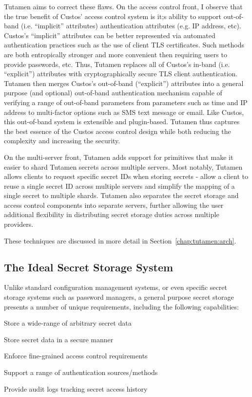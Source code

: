 Tutamen aims to correct these flaws. On the access control front, I
observe that the true benefit of Custos' access control system is it;s
ability to support out-of-band (i.e. ``implicit'' attributes)
authentication attributes (e.g. IP address, etc). Custos's
``implicit'' attributes can be better represented via automated
authentication practices such as the use of client TLS
certificates. Such methods are both entropically stronger and more
convenient then requiring users to provide passwords, etc. Thus,
Tutamen replaces all of Custos's in-band (i.e. ``explicit'')
attributes with cryptographically secure TLS client
authentication. Tutamen then merges Custos's out-of-band
(``explicit'') attributes into a general purpose (and optional)
out-of-band authentication mechanism capable of verifying a range of
out-of-band parameters from parameters such as time and IP address to
multi-factor options such as SMS text message or email. Like Custos,
this out-of-band system is extensible and plugin-based. Tutamen thus
captures the best essence of the Custos access control design while
both reducing the complexity and increasing the security.

On the multi-server front, Tutamen adds support for primitives that
make it easier to shard Tutamen secrets across multiple servers. Most
notably, Tutamen allows clients to request specific secret IDs when
storing secrets - allow a client to reuse a single secret ID across
multiple servers and simplify the mapping of a single secret to
multiple shards. Tutamen also separates the secret storage and access
control components into separate servers, further allowing the user
additional flexibility in distributing secret storage duties across
multiple providers.

These techniques are discussed in more detail in
Section~\ref{chap:tutamen:arch}.

\subsection{The Ideal Secret Storage System}

Unlike standard configuration management systems, or even specific
secret storage systems such as password managers, a general purpose
secret storage presents a number of unique requirements, including the
following capabilities:

\begin{packed_item}
\item Store a wide-range of arbitrary secret data
\item Store secret data in a secure manner
\item Enforce fine-grained access control requirements
\item Support a range of authentication sources/methods
\item Provide audit logs tracking secret access history
\end{packed_item}

